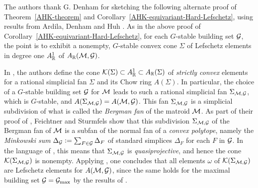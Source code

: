 \begin{remark}
\label{Denham-remark}
The authors thank G. Denham for sketching the following alternate proof of Theorem~\ref{AHK-theorem} and Corollary~\ref{AHK-equivariant-Hard-Lefschetz}, using results from Ardila, Denham and Huh \cite[\S5]{ADH}.
As in the above proof of Corollary~\ref{AHK-equivariant-Hard-Lefschetz}, for each $G$-stable building set $\mathcal{G}$, the point is to exhibit a nonempty, $G$-stable convex cone $\Sigma$ of Lefschetz elements in degree one $A_{\mathbb{R}}^1$ of $A_{\mathbb{R}}(\mathcal{M},\mathcal{G})$.  

In \cite[Defn.~5.1]{ADH}, the authors define the cone $\mathcal{K}(\Sigma) \subset A^1_{\mathbb{R}} \subset A_{\mathbb{R}}(\Sigma)$ of {\it strictly convex} elements for a rational simplicial fan $\Sigma$ and its Chow ring $A(\Sigma)$.  In
particular, the choice of a $G$-stable building set $\mathcal{G}$ for $\mathcal{M}$ leads to
such a rational simplicial fan $\Sigma_{\mathcal{M},\mathcal{G}}$, which is $G$-stable,
and $A(\Sigma_{\mathcal{M},\mathcal{G}})=A(\mathcal{M},\mathcal{G})$.
This fan $\Sigma_{\mathcal{M},\mathcal{G}}$ is a simplicial subdivision of what is called the {\it Bergman fan} of the matroid $\mathcal{M}$.  As part of their proof of \cite[Thm.~6.1]{FeichtnerSturmfels},
Feichtner and Sturmfels show that
this subdivision $\Sigma_{\mathcal{M},\mathcal{G}}$ of the Bergman fan of $\mathcal{M}$ is a subfan of
the normal fan of a {\it convex polytope}, namely
the {\it Minkowski sum} $\Delta_{\mathcal{G}}:=\sum_{F \in \mathcal{G}} \Delta_F$ of standard simplices $\Delta_F$ for each $F$ in $\mathcal{G}$. 
In the language of \cite[Rmk.~5.4]{ADH},
this means that $\Sigma_{\mathcal{M},\mathcal{G}}$ is {\it quasiprojective}, and hence the
cone $\mathcal{K}(\Sigma_{\mathcal{M},\mathcal{G}})$
is nonempty.  Applying \cite[Thm.~1.6]{ADH}, one concludes
that all elements $\omega$ of $\mathcal{K}(\Sigma_{\mathcal{M},\mathcal{G}})$ are  Lefschetz elements for $A(\mathcal{M},\mathcal{G})$, 
since the same holds for the maximal
building set $\mathcal{G}=\mathcal{G}_{\max}$ by the results of \cite{AHK}.
\end{remark}
